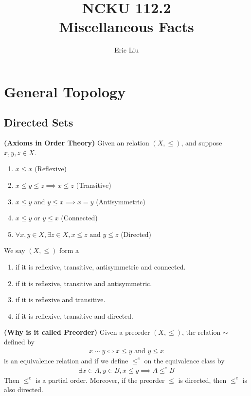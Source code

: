 \documentclass{report}
\title{\Huge{NCKU 112.2}\\
Miscellaneous Facts}
\author{\huge{Eric Liu}}
\date{}
\begin{document}
\maketitle
\newpage%
\tableofcontents
\pagebreak

\chapter{General Topology}
\section{Directed Sets}
\begin{axiom}
\label{1.1.1}
\textbf{(Axioms in Order Theory)} Given an relation $(X,\leq )$, and suppose  $x,y,z \in X$. 
\begin{enumerate}[label=(\alph*)]
  \item $x\leq x$ (Reflexive)
  \item $x\leq y\leq z \implies x\leq z$ (Transitive)
  \item $x\leq y\text{ and }y\leq x\implies x=y$ (Antisymmetric)
  \item $x\leq y\text{ or }y\leq x$ (Connected)
  \item $\forall x,y \in X, \exists z\in X, x\leq z\text{ and }y\leq z$ (Directed)
\end{enumerate}
We say $(X,\leq )$ form a 
\begin{enumerate}[label=(\alph*)]
  \item {} if it is reflexive, transitive, antisymmetric and connected. 
  \item {} if it is reflexive, transitive and  antisymmetric. 
  \item {} if it is reflexive and transitive.
  \item {} if it is reflexive, transitive and directed. 
\end{enumerate}
\end{axiom}
\begin{theorem}
\label{1.1.2}
\textbf{(Why is it called Preorder)} Given a preorder $(X,\leq )$, the relation $\sim$ defined by 
\begin{align*}
x\sim y \iff x\leq y\text{ and }y\leq x
\end{align*}
is an equivalence relation and if we define $\leq^e$ on the equivalence class by 
\begin{align*}
\exists x \in A, y \in B, x\leq y \implies A\leq^e B
\end{align*}
Then $\leq^e$ is a partial order. Moreover, if the preorder $\leq $ is directed, then $\leq ^e$ is also directed.
\end{theorem}
\end{document}
